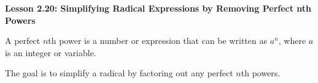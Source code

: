 \begin{center}
\textbf{Lesson 2.20: Simplifying Radical Expressions by Removing Perfect nth Powers}
\end{center}

\vspace*{1ex}

 A perfect \(n\)th power is a number or expression that can be written as \(a^n\), where \(a\) is an integer or variable.

 The goal is to simplify a radical by factoring out any perfect \(n\)th powers.

